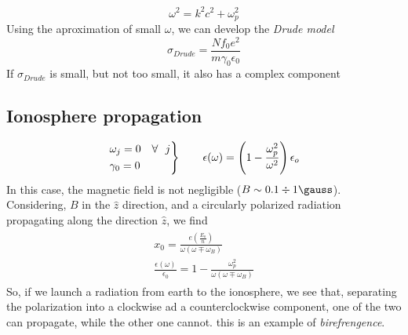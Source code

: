 \documentclass[a4paper, twocolumn]{article}
\begin{document}
\begin{equation}
	\omega^2=k^2c^2+\omega_p^2
\end{equation}
Using the aproximation of small $\omega$, we can develop the \emph{Drude model}
\begin{equation}
	\sigma_{Drude}=\frac{N f_0 e^2}{m \gamma_0 \epsilon_0}
\end{equation}
If $\sigma_{Drude}$ is small, but not too small, it also has a complex component

\subsection{Ionosphere propagation}
\label{sec:ionosph-prop}
\begin{gather}
  \label{eq:51}
  \begin{rcases}
    \omega_j=0  & \forall~~ j \\
    \gamma_0=0 & 
  \end{rcases}
  \begin{aligned}[c]
    \qquad \epsilon(\omega)=\left(1-\frac{\omega_p^2}{\omega^2}  \right)\epsilon_o
  \end{aligned}
\end{gather}
In this case, the magnetic field is not negligible ($B\sim0.1\div 1\si{\gauss}$).
Considering, $B$ in the $\hat{z}$ direction, and a circularly polarized radiation propagating along the direction $\hat{z}$, we find
\begin{align}
  \label{eq:54}
  \begin{split}
    x_0=\frac{e\left(\frac{E_o}{n}\right)}{\omega(\omega\mp\omega_B)} \\
    \frac{\epsilon(\omega)}{\epsilon_0}=1-\frac{\omega_p^2}{\omega(\omega\mp\omega_B)}
  \end{split}
\end{align}
So, if we launch a radiation from earth to the ionosphere, we see that, separating the polarization into a clockwise ad a counterclockwise component, one of the two can propagate, while the other one cannot. this is an example of \emph{birefrengence}.
\end{document}
